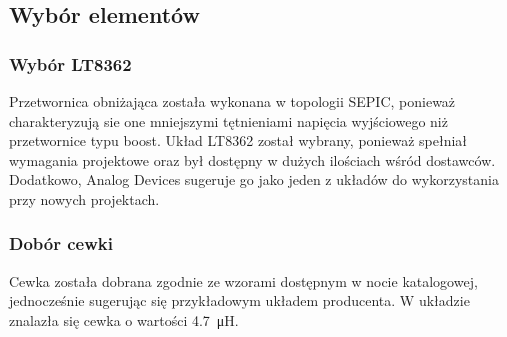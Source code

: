 \documentclass{article}
\begin{document}
\begin{figure}[H]
\begin{adjustbox}{width=1.2\textwidth,center}
{

            \label{fig:subfig2}
        }
    \end{adjustbox}
\end{figure}

\subsection{Wybór elementów}
\subsubsection{Wybór LT8362}
Przetwornica obniżająca została wykonana w topologii SEPIC, ponieważ charakteryzują sie one mniejszymi tętnieniami napięcia wyjściowego niż przetwornice typu boost. Układ LT8362 został wybrany, ponieważ spełniał wymagania projektowe oraz był dostępny w dużych ilościach wśród dostawców. Dodatkowo, Analog Devices sugeruje go jako jeden z układów do wykorzystania przy nowych projektach.

\subsubsection{Dobór cewki}
Cewka została dobrana zgodnie ze wzorami dostępnym w nocie katalogowej, jednocześnie sugerując się przykładowym układem producenta. W układzie znalazła się cewka o wartości \SI{4.7}{\micro\henry}.
\end{document}
